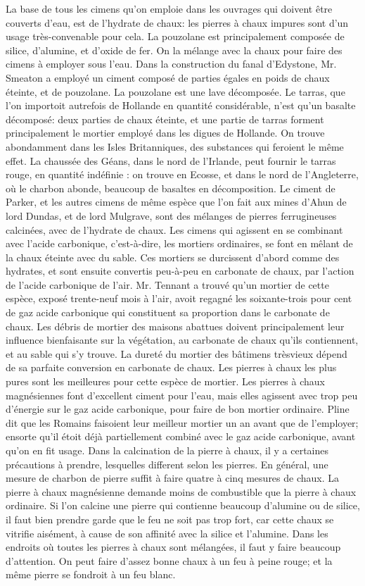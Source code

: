 La base de tous les cimens qu'on emploie dans les ouvrages qui doivent être couverts d'eau, est de l'hydrate de chaux: les pierres à chaux impures sont d'un usage très-convenable pour cela. La pouzolane est principalement composée de silice, d'alumine, et d'oxide de fer. On la mélange avec la chaux pour faire des cimens à employer sous l'eau. Dans la construction du fanal d'Edystone, Mr. Smeaton a employé un ciment composé de parties égales en poids de chaux éteinte, et de pouzolane. La pouzolane est une lave décomposée. Le tarras, que l'on importoit autrefois de Hollande en quantité considérable, n'est qu'un basalte décomposé: deux parties de chaux éteinte, et une partie de tarras forment principalement le mortier employé dans les digues de Hollande. On trouve abondamment dans les Isles Britanniques,\setcounter{page}{231} des substances qui feroient le même effet. La chaussée des Géans, dans le nord de l'Irlande, peut fournir le tarras rouge, en quantité indéfinie : on trouve en Ecosse, et dans le nord de l'Angleterre, où le charbon abonde, beaucoup de basaltes en décomposition. Le ciment de Parker, et les autres cimens de même espèce que l'on fait aux mines d'Ahun de lord Dundas, et de lord Mulgrave, sont des mélanges de pierres ferrugineuses calcinées, avec de l'hydrate de chaux. Les cimens qui agissent en se combinant avec l'acide carbonique, c'est-à-dire, les mortiers ordinaires, se font en mêlant de la chaux éteinte avec du sable. Ces mortiers se durcissent d'abord comme des hydrates, et sont ensuite convertis peu-à-peu en carbonate de chaux, par l'action de l'acide carbonique de l'air. Mr. Tennant a trouvé qu'un mortier de cette espèce, exposé trente-neuf mois à l'air, avoit regagné les soixante-trois pour cent de gaz acide carbonique qui constituent sa proportion dans le carbonate de chaux. Les débris de mortier des maisons abattues doivent principalement leur influence bienfaisante sur la végétation, au carbonate de chaux qu'ils contiennent, et au sable qui s'y trouve. La dureté du mortier des bâtimens trèsvieux\setcounter{page}{232} dépend de sa parfaite conversion en carbonate de chaux. Les pierres à chaux les plus pures sont les meilleures pour cette espèce de mortier. Les pierres à chaux magnésiennes font d'excellent ciment pour l'eau, mais elles agissent avec trop peu d'énergie sur le gaz acide carbonique, pour faire de bon mortier ordinaire.
Pline dit que les Romains faisoient leur meilleur mortier un an avant que de l'employer; ensorte qu'il étoit déjà partiellement combiné avec le gaz acide carbonique, avant qu'on en fit usage.
Dans la calcination de la pierre à chaux, il y a certaines précautions à prendre, lesquelles different selon les pierres. En général, une mesure de charbon de pierre suffit à faire quatre à cinq mesures de chaux. La pierre à chaux magnésienne demande moins de combustible que la pierre à chaux ordinaire. Si l'on calcine une pierre qui contienne beaucoup d'alumine ou de silice, il faut bien prendre garde que le feu ne soit pas trop fort, car cette chaux se vitrifie aisément, à cause de son affinité avec la silice et l'alumine. Dans les endroits où toutes les pierres à chaux sont mélangées, il faut y faire beaucoup d'attention. On peut faire d'assez bonne chaux à un feu à peine\setcounter{page}{233} rouge; et la même pierre se fondroit à un feu blanc.
